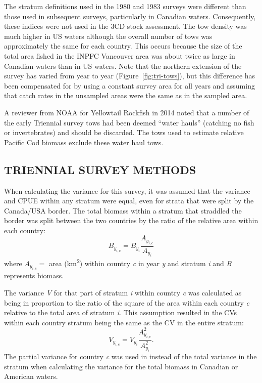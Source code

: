 \documentclass[11pt]{book}
\begin{document}
The stratum definitions used in the 1980 and 1983 surveys were different than those used in subsequent surveys, particularly in Canadian waters. Consequently, these indices were not used in the 3CD stock assessment. The tow density was much higher in US waters although the overall number of tows was approximately the same for each country. This occurs because the size of the total area fished in the INPFC Vancouver area was about twice as large in Canadian waters than in US waters. Note that the northern extension of the survey has varied from year to year (Figure~\ref{fig:tri-tows}), but this difference has been compensated for by using a constant survey area for all years and assuming that catch rates in the unsampled areas were the same as in the sampled area.

A reviewer from NOAA for Yellowtail Rockfish in 2014 noted that a number of the early Triennial survey tows had been deemed ``water hauls'' (catching no fish or invertebrates) and should be discarded. The tows used to estimate relative Pacific Cod biomass exclude these water haul tows.

\hypertarget{triennial-survey-methods}{%
\subsection{TRIENNIAL SURVEY METHODS}\label{triennial-survey-methods}}

When calculating the variance for this survey, it was assumed that the variance and CPUE within any stratum were equal, even for strata that were split by the Canada/USA border. The total biomass within a stratum that straddled the border was split between the two countries by the ratio of the relative area within each country:
\begin{equation}
B_{y_{i,c}}=B_{y_{i}}\frac{A_{y_{i,c}}}{A_{y_{i}}}
\label{eq:tri1}
\end{equation}
where \(A_{y_{i,c}} =\) area (km\textsuperscript{2}) within country \emph{c} in year \emph{y} and stratum \emph{i} and \emph{B} represents biomass.

The variance \emph{V} for that part of stratum \emph{i} within country \emph{c} was calculated as being in proportion to the ratio of the square of the area within each country \emph{c} relative to the total area of stratum \emph{i}. This assumption resulted in the CVs within each country stratum being the same as the CV in the entire stratum:
\begin{equation}
V_{y_{i,c}}=V_{y_{i}}\frac{A_{y_{i,c}}^{2}}{A_{y_{i}}^{2}}.
\label{eq:tri2}
\end{equation}
The partial variance for country \emph{c} was used in instead of the total variance in the stratum when calculating the variance for the total biomass in Canadian or American waters.
\end{document}
